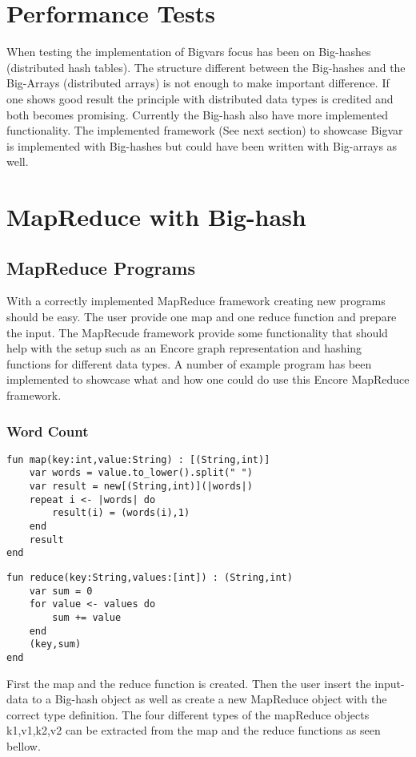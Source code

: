 \section{Performance Tests}
When testing the implementation of Bigvars focus has been on Big-hashes (distributed hash tables). The structure different between the Big-hashes and the Big-Arrays (distributed arrays) is not enough to make important difference. If one shows good result the principle with distributed data types is credited and both becomes promising. Currently the Big-hash also have more implemented functionality. The implemented framework (See next section) to showcase Bigvar is implemented with Big-hashes but could have been written with Big-arrays as well.

\section{MapReduce with Big-hash}

\pagebreak
\subsection{MapReduce Programs}
With a correctly implemented MapReduce framework creating new programs should be easy. The user provide one map and one reduce function and prepare the input. The MapRecude framework provide some functionality that should help with the setup such as an Encore graph representation and hashing functions for different data types. A number of example program has been implemented to showcase what and how one could do use this Encore MapReduce framework.

\subsubsection{Word Count}
\begin{lstlisting}
fun map(key:int,value:String) : [(String,int)]
    var words = value.to_lower().split(" ")
    var result = new[(String,int)](|words|)
    repeat i <- |words| do
        result(i) = (words(i),1)
    end
    result
end
\end{lstlisting}
\begin{lstlisting}
fun reduce(key:String,values:[int]) : (String,int)
    var sum = 0
    for value <- values do
        sum += value
    end
    (key,sum)
end
\end{lstlisting}

First the map and the reduce function is created. Then the user insert the input-data to a Big-hash object as well as create a new MapReduce object with the correct type definition. The four different types of the mapReduce objects k1,v1,k2,v2 can be extracted from the map and the reduce functions as seen bellow.

